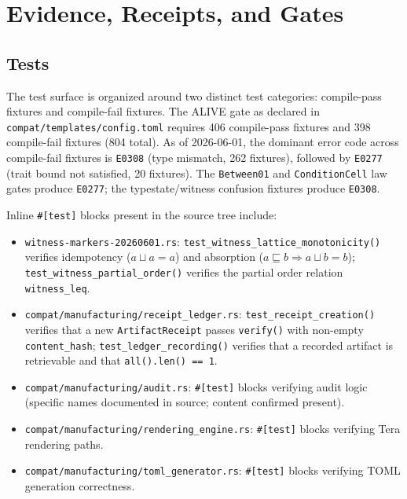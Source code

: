 
\section{Evidence, Receipts, and Gates}
\label{sec:sources-wasm4pm-compat-evidence}

\subsection{Tests}
\label{sec:sources-wasm4pm-compat-evidence-tests}

The test surface is organized around two distinct test categories: compile-pass fixtures
and compile-fail fixtures. The ALIVE gate as declared in
\texttt{compat/templates/config.toml} requires 406 compile-pass fixtures and 398
compile-fail fixtures (804 total). As of 2026-06-01, the dominant error code across
compile-fail fixtures is \texttt{E0308} (type mismatch, 262 fixtures), followed by
\texttt{E0277} (trait bound not satisfied, 20 fixtures). The \texttt{Between01} and
\texttt{ConditionCell} law gates produce \texttt{E0277}; the typestate/witness confusion
fixtures produce \texttt{E0308}.

Inline \texttt{\#[test]} blocks present in the source tree include:

\begin{itemize}
  \item \texttt{witness-markers-20260601.rs}: \texttt{test\_witness\_lattice\_monotonicity()}
    verifies idempotency ($a \sqcup a = a$) and absorption ($a \sqsubseteq b \Rightarrow
    a \sqcup b = b$); \texttt{test\_witness\_partial\_order()} verifies the partial order
    relation \texttt{witness\_leq}.
  \item \texttt{compat/manufacturing/receipt\_ledger.rs}: \texttt{test\_receipt\_creation()}
    verifies that a new \texttt{ArtifactReceipt} passes \texttt{verify()} with non-empty
    \texttt{content\_hash}; \texttt{test\_ledger\_recording()} verifies that a recorded
    artifact is retrievable and that \texttt{all().len() == 1}.
  \item \texttt{compat/manufacturing/audit.rs}: \texttt{\#[test]} blocks verifying audit
    logic (specific names documented in source; content confirmed present).
  \item \texttt{compat/manufacturing/rendering\_engine.rs}: \texttt{\#[test]} blocks
    verifying Tera rendering paths.
  \item \texttt{compat/manufacturing/toml\_generator.rs}: \texttt{\#[test]} blocks
    verifying TOML generation correctness.
\end{itemize}

